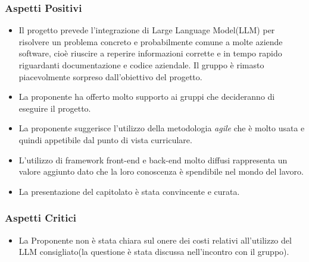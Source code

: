 \documentclass[a4paper, 12pt]{article}
\begin{document}
\subsubsection{Aspetti Positivi}
\begin{itemize}
    \item Il progetto prevede l’integrazione di Large Language Model(LLM) per risolvere un problema concreto e probabilmente comune a molte aziende software, cioè riuscire a reperire informazioni corrette e in tempo rapido riguardanti documentazione e codice aziendale.
    Il gruppo è rimasto piacevolmente sorpreso dall'obiettivo del progetto.
    
    \item La proponente ha offerto molto supporto ai gruppi che decideranno di eseguire il progetto.
    
    \item La proponente suggerisce l’utilizzo della metodologia \textit{agile} che è molto usata e quindi appetibile dal punto di vista curriculare.
    
    \item L’utilizzo di framework front-end e back-end molto diffusi rappresenta un valore aggiunto dato che la loro conoscenza è spendibile nel mondo del lavoro.
    
    \item La presentazione del capitolato è stata convincente e curata.
    
\end{itemize}

\subsubsection{Aspetti Critici}
\begin{itemize}
    \item La Proponente non è stata chiara sul onere dei costi relativi all’utilizzo del LLM consigliato(la questione è stata discussa nell'incontro con il gruppo).
\end{itemize}
\end{document}
